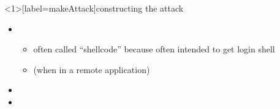 
\begin{frame}<1>[label=makeAttack]{constructing the attack}
\begin{itemize}
\item {}
    \begin{itemize}
    \item often called ``shellcode'' because often intended to get login shell
    \item (when in a remote application)
    \end{itemize}
\item {}
\item {}
\end{itemize}
\end{frame}

